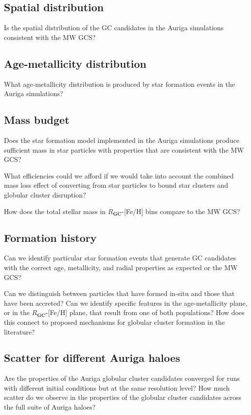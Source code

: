 \documentclass[a4paper,fleqn,usenatbib]{mnras}
\begin{document}
\subsection{Spatial distribution}
\label{sec:spatial}
Is the spatial distribution of the GC candidates in the Auriga simulations consistent with the MW GCS?



\subsection{Age-metallicity distribution}
\label{sec:agemetallicity}
What age-metallicity distribution is produced by star formation events in the Auriga simulations?



\subsection{Mass budget} 
\label{sec:mass}
Does the star formation model implemented in the Auriga simulations produce sufficient mass in star particles with properties that are consistent with the MW GCS?

What efficiencies could we afford if we would take into account the combined mass loss effect of converting from star particles to bound star clusters and globular cluster disruption?

How does the total stellar mass in $R_\textbf{GC}$-[Fe/H] bins compare to the MW GCS?



\subsection{Formation history} 
\label{sec:history}
Can we identify particular star formation events that generate GC candidates with the correct age, metallicity, and radial properties as expected or the MW GCS?

Can we distinguish between particles that have formed in-situ and those that have been accreted? Can we identify specific features in the age-metallicity plane, or in the $R_\textbf{GC}$-[Fe/H] plane, that result from one of both populations? How does this connect to proposed mechanisms for globular cluster formation in the literature?




\subsection{Scatter for different Auriga haloes} 
\label{sec:convergence}
Are the properties of the Auriga globular cluster candidates converged for runs with different initial conditions but at the same resolution level? How much scatter do we observe in the properties of the globular cluster candidates across the full suite of Auriga haloes?
\end{document}
